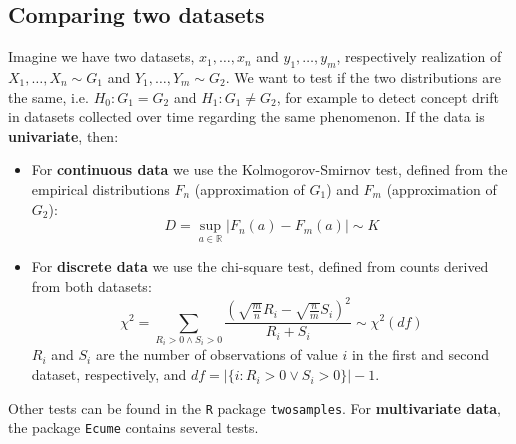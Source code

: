 \subsection{Comparing two datasets}

Imagine we have two datasets, $x_1, \ldots, x_n$ and $y_1, \ldots, y_m$, respectively realization of $X_1, \ldots, X_n \sim G_1$ and $Y_1, \ldots, Y_m \sim G_2$. We want to test if the two distributions are the same, i.e. $H_0 : G_1 = G_2$ and $H_1 : G_1 \not = G_2$, for example to detect concept drift in datasets collected over time regarding the same phenomenon. If the data is \textbf{univariate}, then:
\begin{itemize}
    \item For \textbf{continuous data} we use the Kolmogorov-Smirnov test, defined from the empirical distributions $F_n$ (approximation of $G_1$) and $F_m$ (approximation of $G_2$):
    \begin{equation*}
        D = \sup_{a \in \mathbb{R}} |F_n(a) - F_m(a)| \sim K
    \end{equation*}
    \item For \textbf{discrete data} we use the chi-square test, defined from counts derived from both datasets:
    \begin{equation*}
        \chi^2 = \sum_{R_i > 0 \land S_i > 0} \frac{(\sqrt{\frac{m}{n}} R_i - \sqrt{\frac{n}{m}} S_i)^2}{R_i + S_i} \sim \chi^2(\textit{df})
    \end{equation*}
    $R_i$ and $S_i$ are the number of observations of value $i$ in the first and second dataset, respectively, and $\textit{df} = |\{ i : R_i > 0 \lor S_i > 0 \}| - 1$.
\end{itemize}
Other tests can be found in the \texttt{R} package \texttt{twosamples}. For \textbf{multivariate data}, the package \texttt{Ecume} contains several tests.